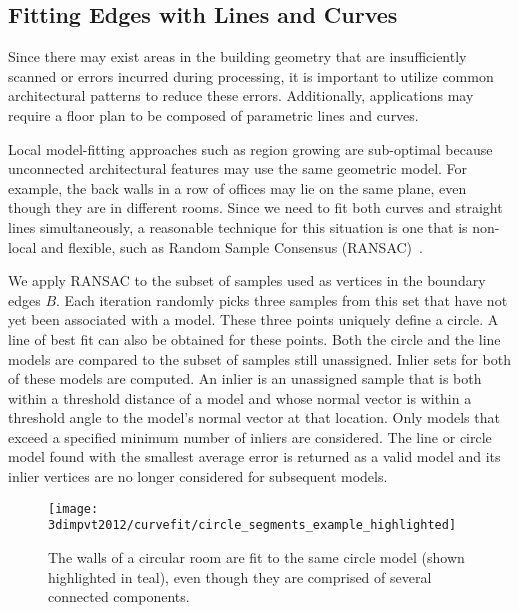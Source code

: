 \documentclass[12pt,onecolumn,oneside]{book}
\begin{document}
\subsection{Fitting Edges with Lines and Curves}
\label{ssec:eigencrust_fitting}

Since there may exist areas in the building geometry that are insufficiently scanned or errors incurred during processing, it is important to utilize common architectural patterns to reduce these errors.  Additionally, applications may require a floor plan to be composed of parametric lines and curves.

Local model-fitting approaches such as region growing are sub-optimal because unconnected architectural features may use the same geometric model.  For example, the back walls in a row of offices may lie on the same plane, even though they are in different rooms. Since we need to fit both curves and straight lines simultaneously, a reasonable technique for this situation is one that is non-local and flexible, such as Random Sample Consensus (RANSAC)~\cite{Ransac}.

We apply RANSAC to the subset of samples used as vertices in the boundary edges $B$.  Each iteration randomly picks three samples from this set that have not yet been associated with a model.  These three points uniquely define a circle.  A line of best fit can also be obtained for these points.  Both the circle and the line models are compared to the subset of samples still unassigned.  Inlier sets for both of these models are computed.  An inlier is an unassigned sample that is both within a threshold distance of a model and whose normal vector is within a threshold angle to the model's normal vector at that location.  Only models that exceed a specified minimum number of inliers are considered.  The line or circle model found with the smallest average error is returned as a valid model and its inlier vertices are no longer considered for subsequent models.

\begin{figure}[t]

\begin{minipage}[b]{1.0\linewidth}
  \centering
  \centerline{\texttt{[image: 3dimpvt2012/curvefit/circle\_segments\_example\_highlighted]}}
\end{minipage}

\caption[Fitting curves to floor plan walls.]{The walls of a circular room are fit to the same circle model (shown highlighted in teal), even though they are comprised of several connected components. }
\label{fig:eigencrust_circle_segments_example}

\end{figure}
\end{document}
